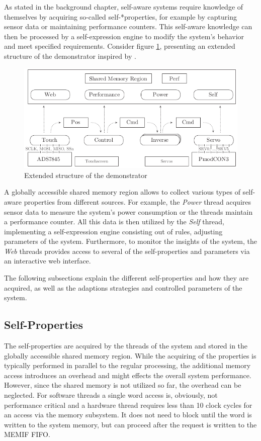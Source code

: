 As stated in the background chapter, self-aware systems require knowledge of
themselves by acquiring so-called self-*properties, for example by capturing
sensor data or maintaining performance counters. This self-aware knowledge can
then be processed by a self-expression engine to modify the system's behavior
and meet specified requirements. Consider figure \ref{fig:demo_selfaware},
presenting an extended structure of the demonstrator inspired by
\citep{AHL14}.
\begin{figure}
	\centering
	\includegraphics{../figures/demo_selfaware}
	\caption{Extended structure of the demonstrator}
	\label{fig:demo_selfaware}
\end{figure}
A globally accessible shared memory region allows to collect various types of
self-aware properties from different sources. For example, the \emph{Power}
thread acquires sensor data to measure the system's power consumption or the
threads maintain a performance counter. All this data is then utilized by the
\emph{Self} thread, implementing a self-expression engine consisting out of
rules, adjusting parameters of the system. Furthermore, to monitor the
insights of the system, the \emph{Web} threads provides access to several of
the self-properties and parameters via an interactive web interface.

The following subsections explain the different self-properties and how they
are acquired, as well as the adaptions strategies and controlled parameters of
the system.

\subsection{Self-Properties}

The self-properties are acquired by the threads of the system and stored in
the globally accessible shared memory region. While the acquiring of the
properties is typically performed in parallel to the regular processing, the
additional memory access introduces an overhead and might effects the
overall system performance. However, since the shared memory is not utilized
so far, the overhead can be neglected. For software threads a
single word access is, obviously, not performance critical and a hardware
thread requires less than 10 clock cycles for an access via the memory
subsystem. It does not need to block until the word is written to the system
memory, but can proceed after the request is written to the \ac{MEMIF}
\ac{FIFO}.

